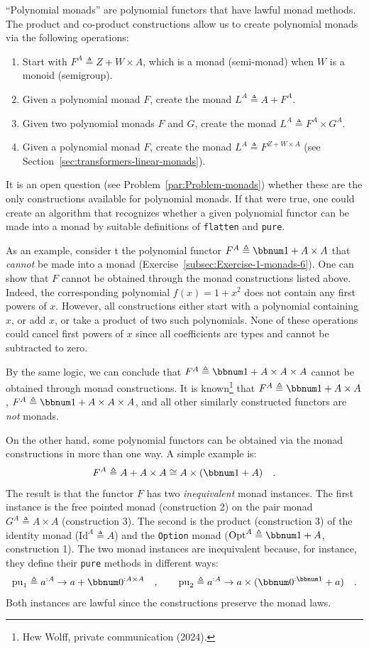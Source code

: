 \textsf{``}Polynomial monads\textsf{''} are polynomial functors that have lawful monad
methods. The product and co-product constructions allow us to create
polynomial monads via the following operations:
\begin{enumerate}
\item Start with $F^{A}\triangleq Z+W\times A$, which is a monad (semi-monad)
when $W$ is a monoid (semigroup).
\item Given a polynomial monad $F$, create the monad $L^{A}\triangleq A+F^{A}$.
\item Given two polynomial monads $F$ and $G$, create the monad $L^{A}\triangleq F^{A}\times G^{A}$.
\item Given a polynomial monad $F$, create the monad $L^{A}\triangleq F^{Z+W\times A}$
(see Section~\ref{sec:transformers-linear-monads}).
\end{enumerate}
It is an open question (see Problem~\ref{par:Problem-monads}) whether
these are the only constructions available for polynomial monads.
If that were true, one could create an algorithm that recognizes whether
a given polynomial functor can be made into a monad by suitable definitions
of \lstinline!flatten! and \lstinline!pure!. 

As an example, consider t the polynomial functor $F^{A}\triangleq\bbnum 1+A\times A$
that \emph{cannot} be made into a monad (Exercise~\ref{subsec:Exercise-1-monads-6}).
One can show that $F$ cannot be obtained through the monad constructions
listed above. Indeed, the corresponding polynomial $f(x)=1+x^{2}$
does not contain any first powers of $x$. However, all constructions
either start with a polynomial containing $x$, or add $x$, or take
a product of two such polynomials. None of these operations could
cancel first powers of $x$ since all coefficients are types and cannot
be subtracted to zero.

By the same logic, we can conclude that $F^{A}\triangleq\bbnum 1+A\times A\times A$
cannot be obtained through monad constructions. It is known\footnote{Hew Wolff, private communication (2024).}
that $F^{A}\triangleq\bbnum 1+A\times A$, $F^{A}\triangleq\bbnum 1+A\times A\times A$,
and all other similarly constructed functors are \emph{not} monads.

On the other hand, some polynomial functors can be obtained via the
monad constructions in more than one way. A simple example is:
\[
F^{A}\triangleq A+A\times A\cong A\times(\bbnum 1+A)\quad.
\]
The result is that the functor $F$ has two \emph{inequivalent} monad
instances. The first instance is the free pointed monad (construction
2) on the pair monad $G^{A}\triangleq A\times A$ (construction 3).
The second is the product (construction 3) of the identity monad ($\text{Id}^{A}\triangleq A$)
and the \lstinline!Option! monad ($\text{Opt}^{A}\triangleq\bbnum 1+A$,
construction 1). The two monad instances are inequivalent because,
for instance, they define their \lstinline!pure! methods in different
ways:
\[
\text{pu}_{1}\triangleq a^{:A}\rightarrow a+\bbnum 0^{:A\times A}\quad,\quad\quad\text{pu}_{2}\triangleq a^{:A}\rightarrow a\times(\bbnum 0^{:\bbnum 1}+a)\quad.
\]
Both instances are lawful since the constructions preserve the monad
laws.

